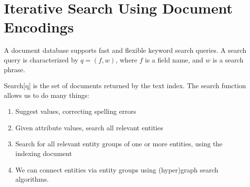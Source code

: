 	\section{Iterative Search Using Document Encodings}
		A document database supports fast and flexible keyword search queries.	A search query is characterized by \(q = (f, w)\), where \(f\) is a field name, and \(w\) is a search phrase.
		
		Search[q] is the set of documents returned by the text index.  The search function allows us to do many things:
		
		\begin{enumerate}
			\item Suggest values, correcting spelling errors
			\item Given attribute values, search all relevant entities
			\item Search for all relevant entity groups of one or more entities, using the indexing document
			\item We can connect entities via entity groups using (hyper)graph search algorithms.
		\end{enumerate}